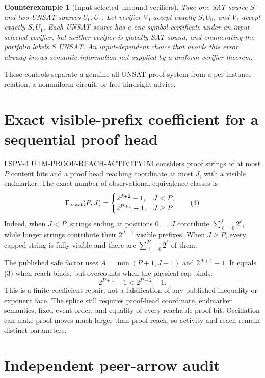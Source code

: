\documentclass[11pt]{article}
\newtheorem{counterexample}[theorem]{Counterexample}
\begin{document}
\begin{counterexample}[Input-selected unsound verifiers]
Take one SAT source $S$ and two UNSAT sources $U_0,U_1$.  Let verifier $V_0$ accept exactly $S,U_0$, and $V_1$ accept exactly $S,U_1$.  Each UNSAT source has a one-symbol certificate under an input-selected verifier, but neither verifier is globally SAT-sound, and enumerating the portfolio labels $S$ UNSAT.  An input-dependent choice that avoids this error already knows semantic information not supplied by a uniform verifier theorem.
\end{counterexample}

These controls separate a genuine all-UNSAT proof system from a per-instance relation, a nonuniform circuit, or free hindsight advice.

\section{Exact visible-prefix coefficient for a sequential proof head}

LSPV-4 UTM-PROOF-REACH-ACTIVITY153 considers proof strings of at most $P$ content bits and a proof head reaching coordinate at most $J$, with a visible endmarker.  The exact number of observational equivalence classes is
\[
 \Gamma_{\rm exact}(P,J)=
 \begin{cases}
   2^{J+2}-1,&J<P,\\
   2^{P+1}-1,&J\ge P.
 \end{cases}                                             \tag{3}
\]
Indeed, when $J<P$, strings ending at positions $0,\ldots,J$ contribute $\sum_{\ell=0}^{J}2^\ell$, while longer strings contribute their $2^{J+1}$ visible prefixes.  When $J\ge P$, every capped string is fully visible and there are $\sum_{\ell=0}^{P}2^\ell$ of them.

The published safe factor uses $A=\min(P+1,J+1)$ and $2^{A+1}-1$.  It equals (3) when reach binds, but overcounts when the physical cap binds:
\[
  2^{P+1}-1 < 2^{P+2}-1.
\]
This is a finite coefficient repair, not a falsification of any published inequality or exponent face.  The splice still requires proof-head coordinate, endmarker semantics, fixed event order, and equality of every reachable proof bit.  Oscillation can make proof moves much larger than proof reach, so activity and reach remain distinct parameters.

\section{Independent peer-arrow audit}
\end{document}
